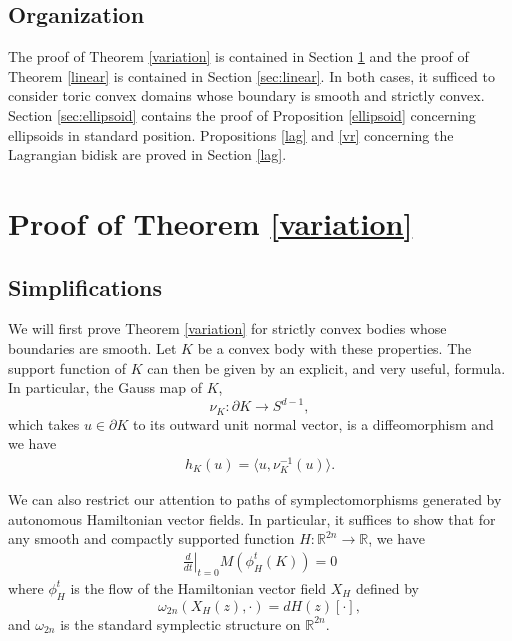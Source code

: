 \documentclass[12pt]{amsart}
\theoremstyle{definition}
\newtheorem{problem}[theorem]{Problem}
\newcommand{\RR}{{\mathbb R}}
\begin{document}




\subsection{Organization}
The proof of Theorem \ref{variation} is contained in Section \ref{sec:variation} and the proof of Theorem \ref{linear} is contained in Section \ref{sec:linear}. In both cases, it sufficed to consider toric convex domains whose boundary is smooth and strictly convex.  Section \ref{sec:ellipsoid} contains the proof of Proposition \ref{ellipsoid} concerning ellipsoids in standard position. Propositions \ref{lag} and \ref{vr} concerning the Lagrangian bidisk are proved in Section \ref{lag}. 

\section{Proof of Theorem \ref{variation}}\label{sec:variation}

\subsection{Simplifications}

We will first prove Theorem \ref{variation} for strictly convex bodies whose boundaries are smooth. Let $K$ be a convex body with these properties. The support function of $K$ can then be given by an explicit, and very useful, formula. In particular, the Gauss map of $K$,
$$\nu_K \colon \partial K \to S^{d-1},$$
which takes $u \in \partial K$ to its outward unit normal vector, is a diffeomorphism and we have
\begin{align*}
    h_K(u)=\langle u, \nu_K^{-1}(u)\rangle.
\end{align*}


We can also restrict our attention to paths of symplectomorphisms generated by autonomous Hamiltonian vector fields. In particular, it suffices to show that for any smooth and  compactly supported function $H\colon \RR^{2n} \to \RR$, we have
\begin{align*}
   \left.\frac{d}{dt}\right|_{t=0} M(\phi^t_H(K)) = 0
\end{align*}
where $\phi^t_H$ is the flow of the Hamiltonian vector field $X_H$ defined by $$\omega_{2n}(X_H(z), \cdot) = dH(z)[\cdot],$$ and $\omega_{2n}$ is the standard symplectic structure on $\RR^{2n}$.
\end{document}
